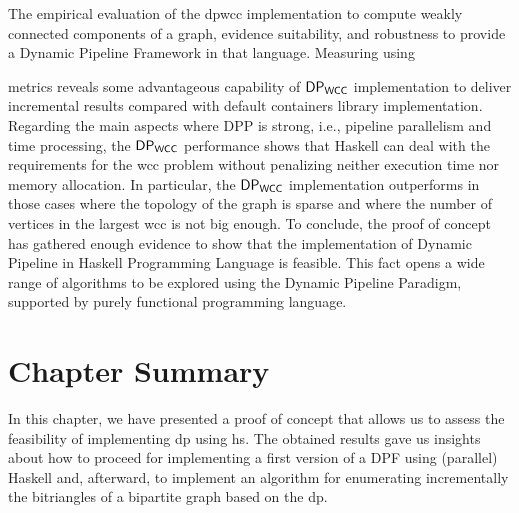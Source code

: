 The empirical evaluation of the \acrshort{dpwcc} implementation to compute weakly connected components of a graph, evidence suitability, 
and robustness to provide a Dynamic Pipeline Framework in that language. Measuring using \par\bigskip metrics reveals some advantageous capability of $\mathsf{DP_{WCC}}$ implementation to deliver incremental results compared with default containers library implementation. 
Regarding the main aspects where DPP is strong, i.e., pipeline parallelism and time processing, the $\mathsf{DP_{WCC}}$ performance shows that Haskell 
can deal with the requirements for the \acrshort{wcc} problem without penalizing neither execution time nor memory allocation. 
In particular, the $\mathsf{DP_{WCC}}$ implementation outperforms in those cases where the topology of the graph is sparse and where the number of vertices in the largest \acrshort{wcc} is not big enough. 
To conclude, the proof of concept has gathered enough evidence to show that the implementation of Dynamic Pipeline in Haskell Programming Language is feasible. 
This fact opens a wide range of algorithms to be explored using the Dynamic Pipeline Paradigm, supported by purely functional programming language.

\section{Chapter Summary}
In this chapter, we have presented a proof of concept that allows us to assess the feasibility of implementing \acrshort{dp} using \acrshort{hs}. 
The obtained results gave us insights about how to proceed for implementing a first version of a DPF using (parallel) Haskell and, afterward, to implement an algorithm for enumerating incrementally the bitriangles of a bipartite graph based on the  \acrshort{dp}.

